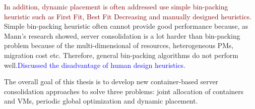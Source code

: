 \textcolor{Maroon}{In addition, dynamic placement is often addressed use simple bin-packing heuristic such as First Fit, Best Fit Decreasing \cite{} and manually designed heuristics.} Simple bin-packing heuristic often cannot provide good performance because, as Mann's research \cite{Mann:2015ua} showed, server consolidation is a lot harder than bin-packing problem because of the multi-dimensional of resources, heterogeneous PMs, migration cost etc. Therefore, general bin-packing algorithms do not perform well.\textcolor{blue}{Discussed the disadvantage of human design heuristics.}








The overall goal of this thesis is to develop new container-based server consolidation approaches to solve three problems: joint allocation of containers  and VMs, periodic global optimization and dynamic placement. 
